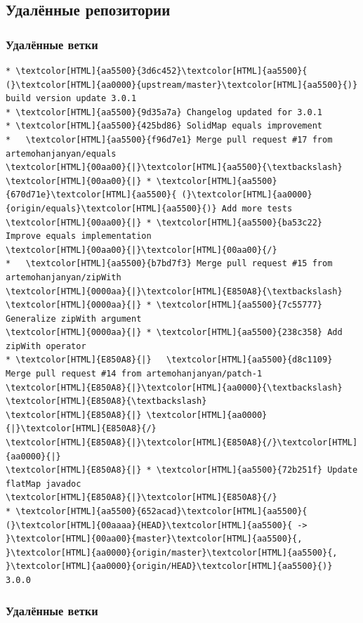 \documentclass[pdf,russian,aspectratio=169]{beamer}
\begin{document}
\subsection{Удалённые репозитории}
\begin{frame}[fragile]
    \frametitle{Удалённые ветки}
    \begin{Verbatim}[commandchars=\\\{\},fontsize=\relsize{-2}]
* \textcolor[HTML]{aa5500}{3d6c452}\textcolor[HTML]{aa5500}{ (}\textcolor[HTML]{aa0000}{upstream/master}\textcolor[HTML]{aa5500}{)} build version update 3.0.1
* \textcolor[HTML]{aa5500}{9d35a7a} Changelog updated for 3.0.1
* \textcolor[HTML]{aa5500}{425bd86} SolidMap equals improvement
*   \textcolor[HTML]{aa5500}{f96d7e1} Merge pull request #17 from artemohanjanyan/equals
\textcolor[HTML]{00aa00}{|}\textcolor[HTML]{aa5500}{\textbackslash}  
\textcolor[HTML]{00aa00}{|} * \textcolor[HTML]{aa5500}{670d71e}\textcolor[HTML]{aa5500}{ (}\textcolor[HTML]{aa0000}{origin/equals}\textcolor[HTML]{aa5500}{)} Add more tests
\textcolor[HTML]{00aa00}{|} * \textcolor[HTML]{aa5500}{ba53c22} Improve equals implementation
\textcolor[HTML]{00aa00}{|}\textcolor[HTML]{00aa00}{/}  
*   \textcolor[HTML]{aa5500}{b7bd7f3} Merge pull request #15 from artemohanjanyan/zipWith
\textcolor[HTML]{0000aa}{|}\textcolor[HTML]{E850A8}{\textbackslash}  
\textcolor[HTML]{0000aa}{|} * \textcolor[HTML]{aa5500}{7c55777} Generalize zipWith argument
\textcolor[HTML]{0000aa}{|} * \textcolor[HTML]{aa5500}{238c358} Add zipWith operator
* \textcolor[HTML]{E850A8}{|}   \textcolor[HTML]{aa5500}{d8c1109} Merge pull request #14 from artemohanjanyan/patch-1
\textcolor[HTML]{E850A8}{|}\textcolor[HTML]{aa0000}{\textbackslash} \textcolor[HTML]{E850A8}{\textbackslash}  
\textcolor[HTML]{E850A8}{|} \textcolor[HTML]{aa0000}{|}\textcolor[HTML]{E850A8}{/}  
\textcolor[HTML]{E850A8}{|}\textcolor[HTML]{E850A8}{/}\textcolor[HTML]{aa0000}{|}   
\textcolor[HTML]{E850A8}{|} * \textcolor[HTML]{aa5500}{72b251f} Update flatMap javadoc
\textcolor[HTML]{E850A8}{|}\textcolor[HTML]{E850A8}{/}  
* \textcolor[HTML]{aa5500}{652acad}\textcolor[HTML]{aa5500}{ (}\textcolor[HTML]{00aaaa}{HEAD}\textcolor[HTML]{aa5500}{ -> }\textcolor[HTML]{00aa00}{master}\textcolor[HTML]{aa5500}{, }\textcolor[HTML]{aa0000}{origin/master}\textcolor[HTML]{aa5500}{, }\textcolor[HTML]{aa0000}{origin/HEAD}\textcolor[HTML]{aa5500}{)} 3.0.0
    \end{Verbatim}
\end{frame}

\begin{frame}[fragile]
    \frametitle{Удалённые ветки}
\end{frame}
\end{document}

